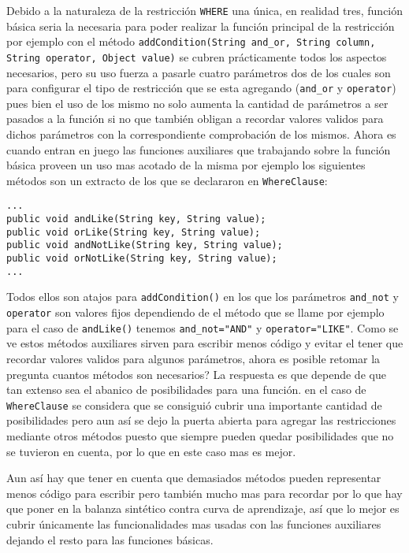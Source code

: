 Debido a la naturaleza de la restricción \verb=WHERE= una única, en realidad tres, función básica seria la necesaria para poder realizar la función principal de la restricción por ejemplo con el método \verb=addCondition(String and_or, String column, String operator, Object value)= se cubren prácticamente todos los aspectos necesarios, pero su uso fuerza a pasarle cuatro parámetros dos de los cuales son para configurar el tipo de restricción que se esta agregando (\verb=and_or= y \verb=operator=) pues bien el uso de los mismo no solo aumenta la cantidad de parámetros a ser pasados a la función si no que también obligan a recordar valores validos para dichos parámetros con la correspondiente comprobación de los mismos. Ahora es cuando entran en juego las funciones auxiliares que trabajando sobre la función básica proveen un uso mas acotado de la misma por ejemplo los siguientes métodos son un extracto de los que se declararon en \verb=WhereClause=:
%
\begin{lstlisting}[title=Extracto de WhereClause]
...
public void andLike(String key, String value);
public void orLike(String key, String value);
public void andNotLike(String key, String value);
public void orNotLike(String key, String value);
...
\end{lstlisting}
%
Todos ellos son atajos para \verb=addCondition()= en los que los parámetros \verb=and_not= y \verb=operator= son valores fijos dependiendo de el método que se llame por ejemplo para el caso de \verb=andLike()= tenemos \verb|and_not="AND"|  y \verb|operator="LIKE"|. Como se ve estos métodos auxiliares sirven para escribir menos código y evitar el tener que recordar valores validos para algunos parámetros, ahora es posible retomar la pregunta cuantos métodos son necesarios? La respuesta es que depende de que tan extenso sea el abanico de posibilidades para una función. en el caso de \verb=WhereClause= se considera que se consiguió cubrir una importante cantidad de posibilidades pero aun así se dejo la puerta abierta para agregar las restricciones mediante otros métodos puesto que siempre pueden quedar posibilidades que no se tuvieron en cuenta, por lo que en este caso mas es mejor.

Aun así hay que tener en cuenta que demasiados métodos pueden representar menos código para escribir pero también mucho mas para recordar por lo que hay que poner en la balanza sintético contra curva de aprendizaje, así que lo mejor es cubrir únicamente las  funcionalidades mas usadas con las funciones auxiliares dejando el resto para las funciones básicas.
%
